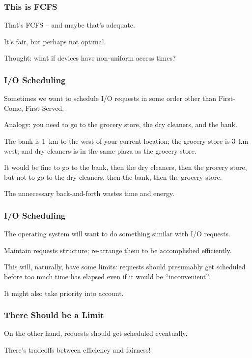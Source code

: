 \begin{frame}
\frametitle{This is FCFS}

That's FCFS -- and maybe that's adequate.

It's fair, but perhaps not optimal.

Thought: what if devices have non-uniform access times?

\end{frame}

\begin{frame}
\frametitle{I/O Scheduling}

Sometimes we want to schedule I/O requests in some order other than First-Come, First-Served. 

Analogy: you need to go to the grocery store, the dry cleaners, and the bank. 

The bank is 1~km to the west of your current location; the grocery store is 3~km west; and dry cleaners is in the same plaza as the grocery store. 

It would be fine to go to the bank, then the dry cleaners, then the grocery store, but not to go to the dry cleaners, then the bank, then the grocery store. 

The unnecessary back-and-forth wastes time and energy.


\end{frame}

\begin{frame}
\frametitle{I/O Scheduling}
The operating system will want to do something similar with I/O requests.

Maintain requests structure; re-arrange them to be accomplished efficiently.

This will, naturally, have some limits: requests should presumably get scheduled before too much time has elapsed even if it would be ``inconvenient''. 

It might also take priority into account. 

\end{frame}


\begin{frame}
\frametitle{There Should be a Limit}

On the other hand, requests should get scheduled eventually.

There's tradeoffs between efficiency and fairness!


\end{frame}


